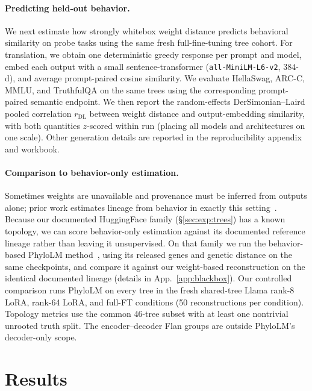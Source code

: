 \documentclass{article}
\theoremstyle{definition}
\theoremstyle{plain}
\begin{document}
\paragraph{Predicting held-out behavior.}
\label{sec:exp:behavioral}
We next estimate how strongly whitebox weight distance predicts behavioral similarity on probe tasks using the same fresh full-fine-tuning tree cohort. For translation, we obtain one deterministic greedy response per prompt and model, embed each output with a small sentence-transformer (\texttt{all-MiniLM-L6-v2}, $384$-d), and average prompt-paired cosine similarity. We evaluate HellaSwag, ARC-C, MMLU, and TruthfulQA on the same trees using the corresponding prompt-paired semantic endpoint. We then report the random-effects DerSimonian--Laird \citep{dersimonianlaird1986} pooled correlation $r_{\mathrm{DL}}$ between weight distance and output-embedding similarity, with both quantities $z$-scored within run (placing all models and architectures on one scale). Other generation details are reported in the reproducibility appendix and workbook.




\paragraph{Comparison to behavior-only estimation.}
\label{sec:exp:blackbox}
Sometimes weights are unavailable and provenance must be inferred from outputs alone; prior work estimates lineage from behavior in exactly this setting~\citep{wu2026llmdna, yax2025phylolm}. Because our documented HuggingFace family (\S\ref{sec:exp:trees}) has a known topology, we can score behavior-only estimation against its documented reference lineage rather than leaving it unsupervised. On that family we run the behavior-based PhyloLM method~\citep{yax2025phylolm}, using its released genes and genetic distance on the same checkpoints, and compare it against our weight-based reconstruction on the identical documented lineage (details in App.~\ref{app:blackbox}). Our controlled comparison runs PhyloLM on every tree in the fresh shared-tree Llama rank-8 LoRA, rank-64 LoRA, and full-FT conditions (50 reconstructions per condition). Topology metrics use the common 46-tree subset with at least one nontrivial unrooted truth split. The encoder--decoder Flan groups are outside PhyloLM's decoder-only scope.


\section{Results}
\label{sec:results}
\end{document}
